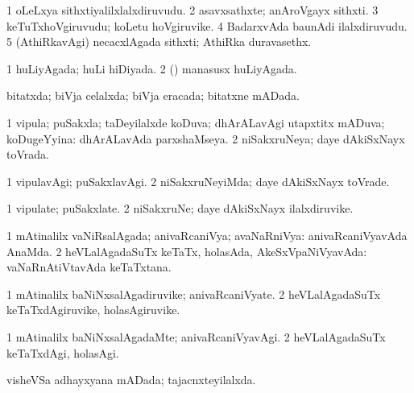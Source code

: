 \bentry
{} 
\gl{\nA}
\expl{}
\bmng
\bnum
\num{1} oLeLxya sithxtiyalilxlalxdiruvudu. 
\num{2} asavxsathxte; anAroVgayx sithxti. 
\num{3} keTuTxhoVgiruvudu; koLetu hoVgiruvike. 
\num{4} BadarxvAda baunAdi ilalxdiruvudu. 
\num{5} (AthiRkavAgi) necacxlAgada sithxti; AthiRka duravasethx. 
\enum
\emng
\eentry

\bentry
{} 
\gl{\gu}
\expl{}
\bmng
\bnum
\num{1} huLiyAgada; huLi hiDiyada. 
\num{2} (\rUpa) manasusx huLiyAgada. 
\enum
\emng
\eentry

\bentry
{} 
\gl{\gu}
\expl{}
\bmng
bitatxda; biVja celalxda; biVja eracada; bitatxne mADada. 
\emng
\eentry

\bentry
{} 
\gl{\gu}
\expl{}
\bmng
\bnum
\num{1} vipula; puSakxla; taDeyilalxde koDuva; dhArALavAgi utapxtitx mADuva; koDugeYyina:  dhArALavAda parxshaMseya. 
\num{2} niSakxruNeya; daye dAkiSxNayx toVrada. 
\enum
\emng
\eentry

\bentry
{} 
\gl{\kirxvi}
\bmng
\bnum
\num{1} vipulavAgi; puSakxlavAgi. 
\num{2} niSakxruNeyiMda; daye dAkiSxNayx toVrade. 
\enum
\emng
\eentry

\bentry
{} 
\gl{\nA}
\expl{}
\bmng
\bnum
\num{1} vipulate; puSakxlate. 
\num{2} niSakxruNe; daye dAkiSxNayx ilalxdiruvike. 
\enum
\emng
\eentry

\bentry
{} 
\gl{\gu}
\expl{}
\bmng
\bnum
\num{1} mAtinalilx vaNiRsalAgada; anivaRcaniVya; avaNaRniVya:  anivaRcaniVyavAda AnaMda. 
\num{2} heVLalAgadaSuTx keTaTx, holasAda, AkeSxVpaNiVyavAda:  vaNaRnAtiVtavAda keTaTxtana. 
\enum
\emng
\eentry

\bentry
{} 
\gl{\nA}
\expl{}
\bmng
\bnum
\num{1} mAtinalilx baNiNxsalAgadiruvike; anivaRcaniVyate. 
\num{2} heVLalAgadaSuTx keTaTxdAgiruvike, holasAgiruvike. 
\enum
\emng
\eentry

\bentry
{} 
\gl{\kirxvi}
\bmng
\bnum
\num{1} mAtinalilx baNiNxsalAgadaMte; anivaRcaniVyavAgi. 
\num{2} heVLalAgadaSuTx keTaTxdAgi, holasAgi. 
\enum
\emng
\eentry

\bentry
{} 
\gl{\gu}
\expl{}
\bmng
visheVSa adhayxyana mADada; tajacnxteyilalxda. 
\emng
\eentry

